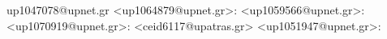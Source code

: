 up1047078@upnet.gr
<up1064879@upnet.gr>:
<up1059566@upnet.gr>:
<up1070919@upnet.gr>:
<ceid6117@upatras.gr>
<up1051947@upnet.gr>: